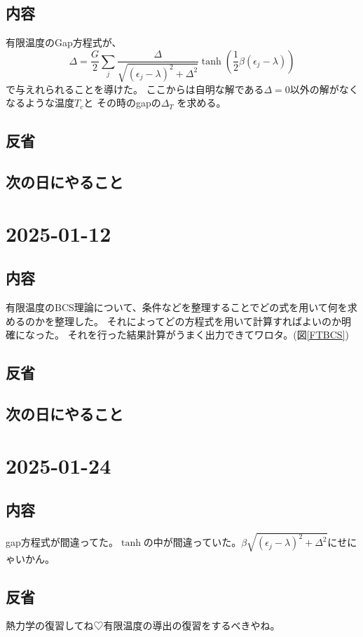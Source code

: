 \documentclass[a4paper,12pt]{jsreport}
\begin{document}
\subsection*{内容}
有限温度のGap方程式が、
\begin{equation}
  \Delta = \dfrac{G}{2}\sum_{j} \dfrac{\Delta}{\sqrt{(\epsilon_j-\lambda)^2+\Delta^2}}\tanh(\dfrac{1}{2}\beta(\epsilon_j-\lambda)) 
\end{equation}
で与えれられることを導けた。
ここからは自明な解である$\Delta=0$以外の解がなくなるような温度$T_c$と
その時のgapの$\Delta_{T}$
を求める。
\subsection*{反省}

\subsection*{次の日にやること}

\section*{2025-01-12}
\subsection*{内容}
有限温度のBCS理論について、条件などを整理することでどの式を用いて何を求めるのかを整理した。
それによってどの方程式を用いて計算すればよいのか明確になった。
それを行った結果計算がうまく出力できてワロタ。(図\ref{FTBCS})

\subsection*{反省}

\subsection*{次の日にやること}

\section*{2025-01-24}
\subsection*{内容}
gap方程式が間違ってた。$\tanh$の中が間違っていた。$\beta\sqrt{(\epsilon_j-\lambda)^2+\Delta^2}$にせにゃいかん。
\subsection*{反省}
熱力学の復習してね♡有限温度の導出の復習をするべきやね。
\end{document}
